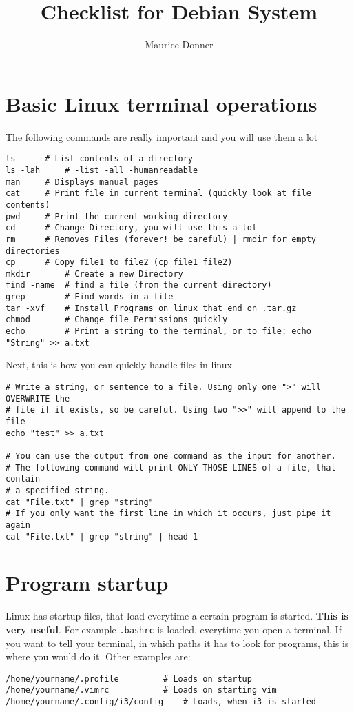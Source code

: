 \documentclass{article}
\title{\textsf{\color{blue!40!black}Checklist for Debian System}}
\author{Maurice Donner}
\begin{document}
\maketitle

\section{Basic Linux terminal operations}
The following commands are really important and you will use them a lot
\begin{lstlisting}
ls	    # List contents of a directory
ls -lah	    # -list -all -humanreadable
man	    # Displays manual pages
cat	    # Print file in current terminal (quickly look at file contents)
pwd	    # Print the current working directory
cd	    # Change Directory, you will use this a lot
rm	    # Removes Files (forever! be careful) | rmdir for empty directories
cp	    # Copy file1 to file2 (cp file1 file2)
mkdir	    # Create a new Directory
find -name  # find a file (from the current directory)
grep	    # Find words in a file
tar -xvf    # Install Programs on linux that end on .tar.gz
chmod	    # Change file Permissions quickly
echo	    # Print a string to the terminal, or to file: echo "String" >> a.txt
\end{lstlisting}
Next, this is how you can quickly handle files in linux
\begin{lstlisting}
# Write a string, or sentence to a file. Using only one ">" will OVERWRITE the
# file if it exists, so be careful. Using two ">>" will append to the file
echo "test" >> a.txt 

# You can use the output from one command as the input for another.
# The following command will print ONLY THOSE LINES of a file, that contain
# a specified string.
cat "File.txt" | grep "string"
# If you only want the first line in which it occurs, just pipe it again
cat "File.txt" | grep "string" | head 1
\end{lstlisting}

\section{Program startup}
Linux has startup files, that load everytime a certain program is started.
\textbf{This is very useful}. For example \verb`.bashrc` is loaded, everytime
you open a terminal. If you want to tell your terminal, in which paths it has to
look for programs, this is where you would do it. Other examples are:
\begin{lstlisting}
/home/yourname/.profile		    # Loads on startup
/home/yourname/.vimrc		    # Loads on starting vim
/home/yourname/.config/i3/config    # Loads, when i3 is started
\end{lstlisting}
\end{document}
